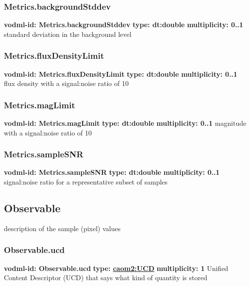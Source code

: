     \subsubsection{Metrics.backgroundStddev}
      \textbf{vodml-id: Metrics.backgroundStddev} \newline
      \textbf{type: dt:double} \newline
      \textbf{multiplicity: 0..1} \newline
      standard deviation in the background level

    \subsubsection{Metrics.fluxDensityLimit}
      \textbf{vodml-id: Metrics.fluxDensityLimit} \newline
      \textbf{type: dt:double} \newline
      \textbf{multiplicity: 0..1} \newline
      flux density with a signal:noise ratio of 10

    \subsubsection{Metrics.magLimit}
      \textbf{vodml-id: Metrics.magLimit} \newline
      \textbf{type: dt:double} \newline
      \textbf{multiplicity: 0..1} \newline
      magnitude with a signal:noise ratio of 10

    \subsubsection{Metrics.sampleSNR}
      \textbf{vodml-id: Metrics.sampleSNR} \newline
      \textbf{type: dt:double} \newline
      \textbf{multiplicity: 0..1} \newline
      signal:noise ratio for a representative subset of samples

  \subsection{Observable}
  \label{sect:Observable}
    description of the sample (pixel) values

    \subsubsection{Observable.ucd}
      \textbf{vodml-id: Observable.ucd} \newline
      \textbf{type: \hyperref[sect:UCD]{caom2:UCD}} \newline
      \textbf{multiplicity: 1} \newline
      Unified Content Descriptor (UCD) that says what kind of quantity is stored

